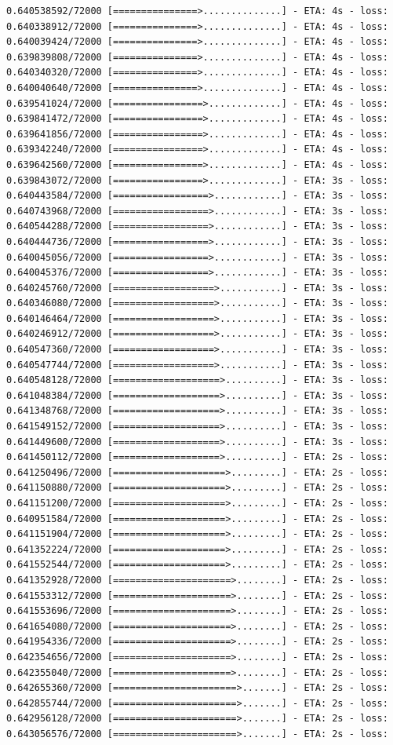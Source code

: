 \documentclass[12pt,fleqn]{article}\usepackage{../../common}
\begin{document}
\begin{verbatim}
0.640538592/72000 [===============>..............] - ETA: 4s - loss: 0.640338912/72000 [===============>..............] - ETA: 4s - loss: 0.640039424/72000 [===============>..............] - ETA: 4s - loss: 0.639839808/72000 [===============>..............] - ETA: 4s - loss: 0.640340320/72000 [===============>..............] - ETA: 4s - loss: 0.640040640/72000 [===============>..............] - ETA: 4s - loss: 0.639541024/72000 [================>.............] - ETA: 4s - loss: 0.639841472/72000 [================>.............] - ETA: 4s - loss: 0.639641856/72000 [================>.............] - ETA: 4s - loss: 0.639342240/72000 [================>.............] - ETA: 4s - loss: 0.639642560/72000 [================>.............] - ETA: 4s - loss: 0.639843072/72000 [================>.............] - ETA: 3s - loss: 0.640443584/72000 [=================>............] - ETA: 3s - loss: 0.640743968/72000 [=================>............] - ETA: 3s - loss: 0.640544288/72000 [=================>............] - ETA: 3s - loss: 0.640444736/72000 [=================>............] - ETA: 3s - loss: 0.640045056/72000 [=================>............] - ETA: 3s - loss: 0.640045376/72000 [=================>............] - ETA: 3s - loss: 0.640245760/72000 [==================>...........] - ETA: 3s - loss: 0.640346080/72000 [==================>...........] - ETA: 3s - loss: 0.640146464/72000 [==================>...........] - ETA: 3s - loss: 0.640246912/72000 [==================>...........] - ETA: 3s - loss: 0.640547360/72000 [==================>...........] - ETA: 3s - loss: 0.640547744/72000 [==================>...........] - ETA: 3s - loss: 0.640548128/72000 [===================>..........] - ETA: 3s - loss: 0.641048384/72000 [===================>..........] - ETA: 3s - loss: 0.641348768/72000 [===================>..........] - ETA: 3s - loss: 0.641549152/72000 [===================>..........] - ETA: 3s - loss: 0.641449600/72000 [===================>..........] - ETA: 3s - loss: 0.641450112/72000 [===================>..........] - ETA: 2s - loss: 0.641250496/72000 [====================>.........] - ETA: 2s - loss: 0.641150880/72000 [====================>.........] - ETA: 2s - loss: 0.641151200/72000 [====================>.........] - ETA: 2s - loss: 0.640951584/72000 [====================>.........] - ETA: 2s - loss: 0.641151904/72000 [====================>.........] - ETA: 2s - loss: 0.641352224/72000 [====================>.........] - ETA: 2s - loss: 0.641552544/72000 [====================>.........] - ETA: 2s - loss: 0.641352928/72000 [=====================>........] - ETA: 2s - loss: 0.641553312/72000 [=====================>........] - ETA: 2s - loss: 0.641553696/72000 [=====================>........] - ETA: 2s - loss: 0.641654080/72000 [=====================>........] - ETA: 2s - loss: 0.641954336/72000 [=====================>........] - ETA: 2s - loss: 0.642354656/72000 [=====================>........] - ETA: 2s - loss: 0.642355040/72000 [=====================>........] - ETA: 2s - loss: 0.642655360/72000 [======================>.......] - ETA: 2s - loss: 0.642855744/72000 [======================>.......] - ETA: 2s - loss: 0.642956128/72000 [======================>.......] - ETA: 2s - loss: 0.643056576/72000 [======================>.......] - ETA: 2s - loss: 
\end{verbatim}
\end{document}
